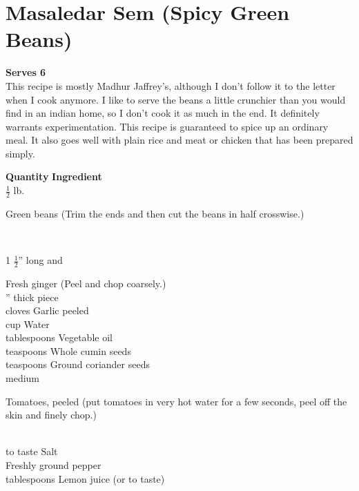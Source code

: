 \section{Masaledar Sem (Spicy Green Beans)}
{\bf Serves 6}\\
  This recipe is mostly Madhur Jaffrey's, although  I  don't  follow  it  to  the
letter  when I cook anymore.  I like to serve the beans a little crunchier than
you would find in an indian home, so I don't cook it as much in  the  end.    It
definitely  warrants  experimentation.  This recipe is guaranteed to spice up an
ordinary meal.  It also goes well with plain rice and meat or  chicken  that  has  been
prepared simply. 

\begin{tabbing}
\hspace{1.0cm}  \={\bf Quantity}   \hspace{3.0cm} \={\bf Ingredient}\\
     $\frac{1}{2}$  lb. \> \parbox[t]{2in}{Green beans  (Trim the ends and then cut the  beans in half
     cross\-wise.)}\\
   \>\parbox[t]{2.5in}{1 $\frac{1}{2}$'' long and} \> Fresh ginger  (Peel and chop coarsely.)\\
   '' thick piece \> \\
    cloves \>Garlic peeled\\
    cup \>Water\\
    tablespoons \>Vegetable oil\\
    teaspoons \>Whole cumin seeds\\
    teaspoons \>Ground coriander seeds\\
    medium \> \parbox[t]{2in}{To\-ma\-toes, peeled (put to\-ma\-toes in very hot water  for  a  few
     sec\-onds, peel off the skin and finely chop.)}\\
   \>to taste   \>Salt \\
   \>  \>Freshly ground pepper\\
    tablespoons \>Lemon juice (or to taste)\\
\end{tabbing}

